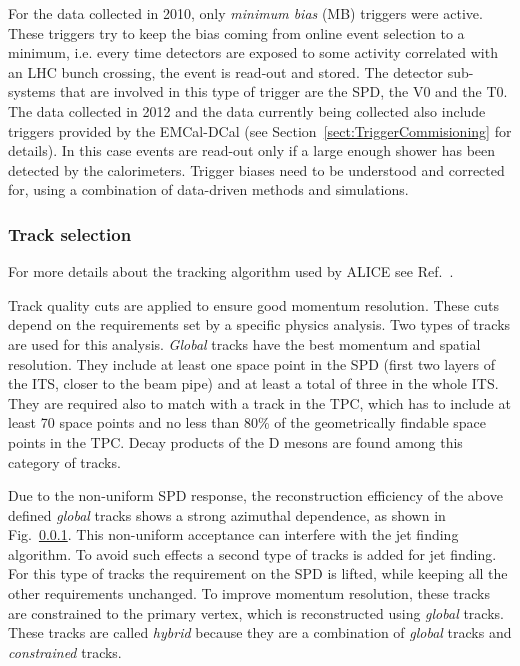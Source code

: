 \documentclass[12pt, a4paper, twoside, titlepage]{article}
\begin{document}
For the data collected in 2010, only \emph{minimum bias} (MB) triggers were active. These triggers
try to keep the bias coming from online event selection to a minimum, i.e. every time detectors
are exposed to some activity correlated with an LHC bunch crossing, the event is read-out and stored.
The detector sub-systems that are involved in this type of trigger are the SPD, the V0 and the T0.
The data collected in 2012 and the data currently being collected also include triggers
provided by the EMCal-DCal (see Section~\ref{sect:TriggerCommisioning} for details).
In this case events are read-out only if a large enough shower has been detected by the calorimeters.
Trigger biases need to be understood and corrected for, using a combination of data-driven methods and simulations.

\subsubsection{Track selection}
For more details about the tracking algorithm used by ALICE see Ref.~\cite{}.

Track quality cuts are applied to ensure good momentum resolution. These cuts
depend on the requirements set by a specific physics analysis.
Two types of tracks are used for this analysis. \emph{Global} tracks have the best
momentum and spatial resolution. They include at least one space point in the SPD (first two
layers of the ITS, closer to the beam pipe) and at least a total of three in the whole ITS. They are required also to
match with a track in the TPC, which has to include at least 70 space points and no less than 80\% of the geometrically findable 
space points in the TPC. Decay products of the D mesons are found among this category of tracks.

Due to the non-uniform SPD response, the reconstruction efficiency of the above defined \emph{global} tracks shows a strong azimuthal dependence,
as shown in Fig.~\ref{}. This non-uniform acceptance can interfere with the jet finding algorithm. To avoid such effects a second type of tracks is added for jet finding.
For this type of tracks the requirement on the SPD is lifted, while keeping all the other requirements unchanged. To improve momentum resolution,
these tracks are constrained to the primary vertex, which is reconstructed using \emph{global} tracks. These tracks are called \emph{hybrid} because
they are a combination of \emph{global} tracks and \emph{constrained} tracks.
\end{document}
